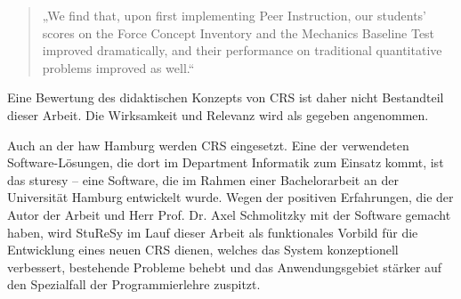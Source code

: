 \begin{quote}
„We find that, upon first implementing Peer Instruction, our students’ scores on the Force Concept Inventory and the Mechanics Baseline Test improved dramatically, and their performance on traditional quantitative problems improved as well.“
\end{quote}


Eine Bewertung des didaktischen Konzepts von CRS ist daher nicht Bestandteil dieser Arbeit. Die Wirksamkeit und Relevanz wird als gegeben angenommen.

Auch an der \ac{haw} Hamburg werden CRS eingesetzt. Eine der verwendeten Software-Lösungen, die dort im Department Informatik zum Einsatz kommt, ist das \ac{sturesy} – eine Software, die im Rahmen einer Bachelorarbeit an der Universität Hamburg entwickelt wurde\cite{sturesy}. Wegen der positiven Erfahrungen, die der Autor der Arbeit und Herr Prof. Dr. Axel Schmolitzky mit der Software gemacht haben, wird StuReSy im Lauf dieser Arbeit als funktionales Vorbild für die Entwicklung eines neuen CRS dienen, welches das System konzeptionell verbessert, bestehende Probleme behebt und das Anwendungsgebiet stärker auf den Spezialfall der Programmierlehre zuspitzt.